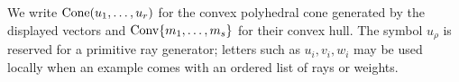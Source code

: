 We write \(\operatorname{Cone}(u_1,\ldots,u_r)\) for the convex polyhedral cone
generated by the displayed vectors and \(\operatorname{Conv}\{m_1,\ldots,m_s\}\)
for their convex hull. The symbol \(u_\rho\) is reserved for a
primitive ray generator; letters such as \(u_i,v_i,w_i\) may be used
locally when an example comes with an ordered list of rays or weights.
